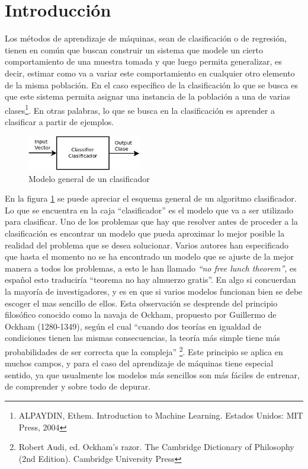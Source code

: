 \documentclass[a4paper, 11pt, oneside]{report}
\begin{document}
\section{Introducción}

Los métodos de aprendizaje de máquinas, sean de clasificación o de regresión, tienen en común que buscan construir un sistema que modele un cierto comportamiento de una muestra tomada y que luego permita generalizar, es decir, estimar como va a variar este comportamiento en cualquier otro elemento de la misma población. En el caso específico de la clasificación lo que se busca es que este sistema permita asignar una instancia de la población a una de varias clases\footnote{ALPAYDIN, Ethem. Introduction to Machine Learning. Estados Unidos: MIT Press, 2004}. En otras palabras, lo que se busca en la clasificación es aprender a clasificar a partir de ejemplos.

	\begin{figure}[htb]
	\begin{center}
	\leavevmode
	\includegraphics[width=5cm]{diagrams/classifier1.jpg}
	\end{center}
	\caption{Modelo general de un clasificador}
	\label{fig:classif1}
	\end{figure}

En la figura \ref{fig:classif1} se puede apreciar el esquema general de un algoritmo clasificador. Lo que se encuentra en la caja ``clasificador'' es el modelo que va a ser utilizado para clasificar. Uno de los problemas que hay que resolver antes de proceder a la clasificación es encontrar un modelo que pueda aproximar lo mejor posible la realidad del problema que se desea solucionar. Varios autores han especificado que hasta el momento no se ha encontrado un modelo que se ajuste de la mejor manera a todos los problemas, a esto le han llamado {\it ``no free lunch theorem''}, es español esto traduciría ``teorema no hay almuerzo gratis''. En algo si concuerdan la mayoría de investigadores, y es en que si varios modelos funcionan bien se debe escoger el mas sencillo de ellos. Esta observación se desprende del principio filosófico conocido como la navaja de Ockham, propuesto por Guillermo de Ockham (1280-1349), según el cual ``cuando dos teorías en igualdad de condiciones tienen las mismas consecuencias, la teoría más simple tiene más probabilidades de ser correcta que la compleja'' \footnote{Robert Audi, ed. Ockham's razor. The Cambridge Dictionary of Philosophy (2nd Edition). Cambridge University Press}. Este principio se aplica en muchos campos, y para el caso del aprendizaje de máquinas tiene especial sentido, ya que usualmente los modelos más sencillos son más fáciles de entrenar, de comprender y sobre todo de depurar.
\end{document}
